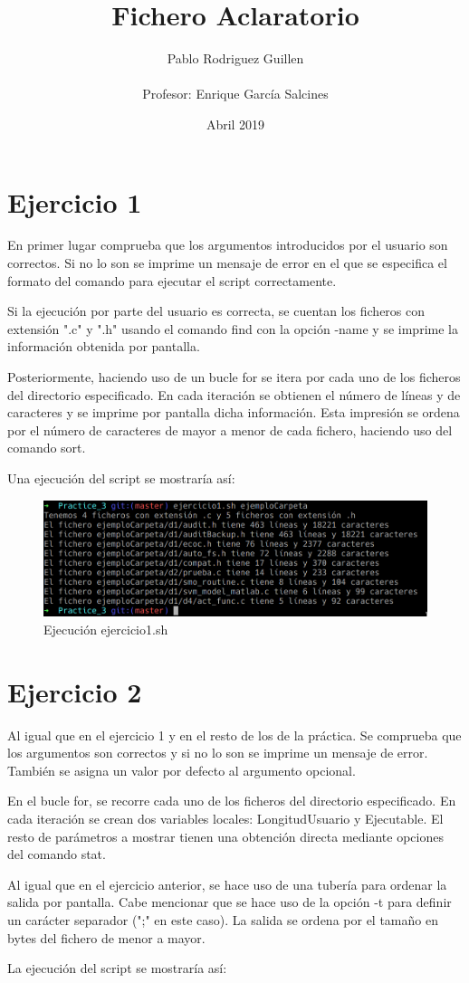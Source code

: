 \documentclass{article}
\title{Fichero Aclaratorio}
\author{Pablo Rodriguez Guillen \\ \\ Profesor: Enrique García Salcines}
\date{Abril 2019}
\begin{document}
\maketitle

\renewcommand\thesection{}

\section{Ejercicio 1}
En primer lugar comprueba que los argumentos introducidos por el usuario son correctos. Si no lo son se imprime un mensaje de error en el que se especifica el formato del comando para ejecutar el script correctamente.\par
Si la ejecución por parte del usuario es correcta, se cuentan los ficheros con extensión ".c" y ".h" usando el comando find con la opción -name y se imprime la información obtenida por pantalla.\par
Posteriormente, haciendo uso de un bucle for se itera por cada uno de los ficheros del directorio especificado. En cada iteración se obtienen el número de líneas y de caracteres y se imprime por pantalla dicha información. Esta impresión se ordena por el número de caracteres de mayor a menor de cada fichero, haciendo uso del comando sort.\par
Una ejecución del script se mostraría así:

\begin{figure}[ht]
    \centering
    \includegraphics[width=1\textwidth]{ejercicio1.png}
    \caption{Ejecución ejercicio1.sh}
\end{figure}

\section{Ejercicio 2}
Al igual que en el ejercicio 1 y en el resto de los de la práctica. Se comprueba que los argumentos son correctos y si no lo son se imprime un mensaje de error. También se asigna un valor por defecto al argumento opcional.\par
En el bucle for, se recorre cada uno de los ficheros del directorio especificado. En cada iteración se crean dos variables locales: LongitudUsuario y Ejecutable. El resto de parámetros a mostrar tienen una obtención directa mediante opciones del comando stat.\par
Al igual que en el ejercicio anterior, se hace uso de una tubería para ordenar la salida por pantalla. Cabe mencionar que se hace uso de la opción -t para definir un carácter separador (";" en este caso). La salida se ordena por el tamaño en bytes del fichero de menor a mayor.\par
La ejecución del script se mostraría así:
\end{document}
